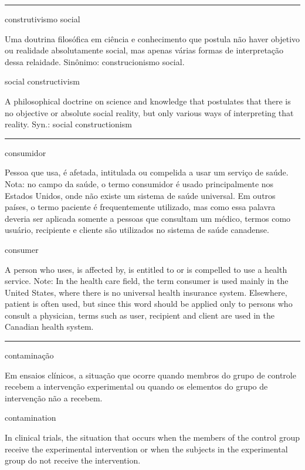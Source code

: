 \documentclass[
  openany]{book}
\begin{document}
\begin{center}\rule{0.5\linewidth}{0.5pt}\end{center}

construtivismo social

Uma doutrina filosófica em ciência e conhecimento que postula não haver objetivo ou realidade absolutamente social, mas apenas várias formas de interpretação dessa relaidade. Sinônimo: construcionismo social.

social constructivism

A philosophical doctrine on science and knowledge that postulates that there is no objective or absolute social reality, but only various ways of interpreting that reality. Syn.: social constructionism

\begin{center}\rule{0.5\linewidth}{0.5pt}\end{center}

consumidor

Pessoa que usa, é afetada, intitulada ou compelida a usar um serviço de saúde. Nota: no campo da saúde, o termo consumidor é usado principalmente nos Estados Unidos, onde não existe um sistema de saúde universal. Em outros países, o termo paciente é frequentemente utilizado, mas como essa palavra deveria ser aplicada somente a pessoas que consultam um médico, termos como usuário, recipiente e cliente são utilizados no sistema de saúde canadense.

consumer

A person who uses, is affected by, is entitled to or is compelled to use a health service. Note: In the health care field, the term consumer is used mainly in the United States, where there is no universal health insurance system. Elsewhere, patient is often used, but since this word should be applied only to persons who consult a physician, terms such as user, recipient and client are used in the Canadian health system.

\begin{center}\rule{0.5\linewidth}{0.5pt}\end{center}

contaminação

Em ensaios clínicos, a situação que ocorre quando membros do grupo de controle recebem a intervenção experimental ou quando os elementos do grupo de intervenção não a recebem.

contamination

In clinical trials, the situation that occurs when the members of the control group receive the experimental intervention or when the subjects in the experimental group do not receive the intervention.
\end{document}

